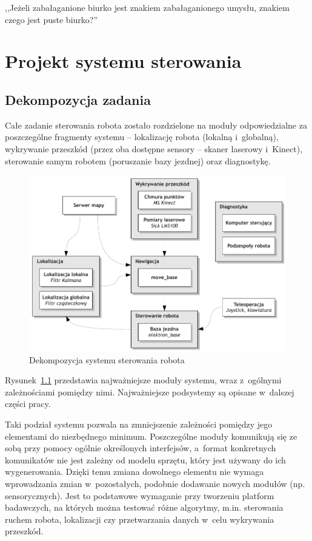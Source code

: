 

\begin{savequote}[70mm]
,,Jeżeli zabałaganione biurko jest znakiem zabałaganionego umysłu, znakiem czego
jest puste biurko?''
\end{savequote}


\chapter{Projekt systemu sterowania}
\label{chap:software}

\section{Dekompozycja zadania}

Całe zadanie sterowania robota zostało rozdzielone na moduły odpowiedzialne
za poszczególne fragmenty systemu -- lokalizację robota (lokalną i~globalną),
wykrywanie przeszkód (przez oba dostępne sensory -- skaner laserowy i~Kinect),
sterowanie samym robotem (poruszanie bazy jezdnej) oraz diagnostykę.

\begin{figure}[ht!]
\centering
\includegraphics{../img/decomposition}
\caption{Dekompozycja systemu sterowania robota}
\label{fig:decomposition}
\end{figure}

Rysunek~\ref{fig:decomposition} przedstawia najważniejsze moduły systemu,
wraz z~ogólnymi zależnościami pomiędzy nimi. Najważniejsze podsystemy
są opisane w~dalszej części pracy.

Taki podział systemu pozwala na zmniejszenie zależności pomiędzy jego elementami
do niezbędnego minimum. Poszczególne moduły komunikują się ze sobą przy pomocy
ogólnie określonych interfejsów, a~format konkretnych komunikatów nie jest
zależny od modelu sprzętu, który jest używany do ich wygenerowania. Dzięki temu
zmiana dowolnego elementu nie wymaga wprowadzania zmian w~pozostałych,
podobnie dodawanie nowych modułów (np. sensorycznych). Jest to podstawowe
wymaganie przy tworzeniu platform badawczych, na których można testować różne
algorytmy, m.in. sterowania ruchem robota, lokalizacji czy przetwarzania danych
w~celu wykrywania przeszkód.


